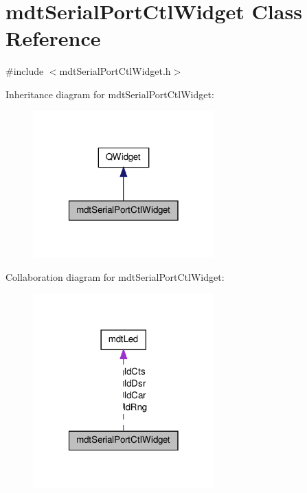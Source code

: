 \hypertarget{classmdt_serial_port_ctl_widget}{\section{mdt\-Serial\-Port\-Ctl\-Widget Class Reference}
\label{classmdt_serial_port_ctl_widget}
}


{\ttfamily \#include $<$mdt\-Serial\-Port\-Ctl\-Widget.\-h$>$}



Inheritance diagram for mdt\-Serial\-Port\-Ctl\-Widget\-:
\nopagebreak
\begin{figure}[H]
\begin{center}
\leavevmode
\includegraphics[width=198pt]{classmdt_serial_port_ctl_widget__inherit__graph}
\end{center}
\end{figure}


Collaboration diagram for mdt\-Serial\-Port\-Ctl\-Widget\-:
\nopagebreak
\begin{figure}[H]
\begin{center}
\leavevmode
\includegraphics[width=198pt]{classmdt_serial_port_ctl_widget__coll__graph}
\end{center}
\end{figure}

